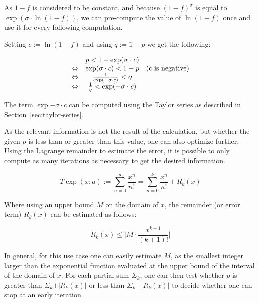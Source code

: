 \documentclass[11pt,a4paper,dvipsnames]{article}
\theoremstyle{definition}
\theoremstyle{definition}
\begin{document}
As $1-f$ is considered to be constant, and because ${(1-f)}^{\sigma}$ is equal
to $\exp(\sigma\cdot\ln(1-f))$, we can pre-compute the value of $\ln(1-f)$ once
and use it for every following computation.

Setting $c:= \ln(1 - f)$ and using $q := 1 - p$ we get the following:

\begin{equation*}
  \begin{array}[h]{ccc}
    & p < 1 - \exp(\sigma \cdot c) & \\
    \Leftrightarrow & \exp(\sigma \cdot c) < 1 - p & (\textrm{c is negative})\\
    \Leftrightarrow & \frac{1}{\exp(-\sigma \cdot c)} < q & \\
    \Leftrightarrow & \frac{1}{q} < \exp(-\sigma \cdot c) &
  \end{array}
\end{equation*}

The term $\exp{-\sigma \cdot c}$ can be computed using the Taylor series as
described in Section~\ref{sec:taylor-series}.

As the relevant information is not the result of the calculation, but whether
the given $p$ is less than or greater than this value, one can also optimize
further. Using the Lagrange remainder to estimate the error, it is possible to
only compute as many iterations as necessary to get the desired information.

\begin{equation*}
    T \exp(x; a) := \sum_{n=0}^{\infty}\frac{x^{n}}{n!} =
    \sum_{n=0}^k\frac{x^{n}}{n!} + R_{k}(x)
\end{equation*}

Where using an upper bound $M$ on the domain of $x$, the remainder (or error
term) $R_{k}(x)$ can be estimated as follows:

\begin{equation*}
  R_{k}(x) \leq \vert M \cdot \frac{x^{k+1}}{(k+1)!}\vert
\end{equation*}

In general, for this use case one can easily estimate $M$, as the smallest
integer larger than the exponential function evaluated at the upper bound of the
interval of the domain of $x$. For each partial sum $\Sigma_{k}$, one can then
test whether $p$ is greater than $\Sigma_k + \vert R_{k}(x) \vert$ or less than
$\Sigma_k - \vert R_{k}(x)\vert$ to decide whether one can stop at an early
iteration.



\end{document}
